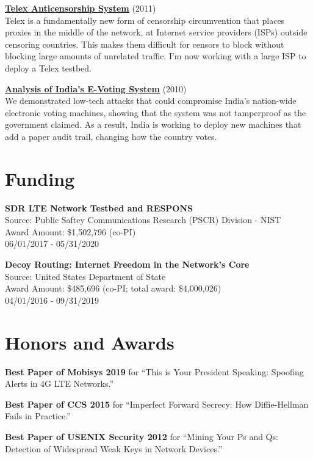 \documentclass[margin,11pt]{res} %
\begin{document}
\textbf{\href{https://telex.cc/}{Telex Anticensorship System}} (2011)\\
Telex is a fundamentally new form of censorship circumvention that places proxies in the middle of the network, at Internet service providers (ISPs) outside censoring countries.  This makes them difficult for censors to block without blocking large amounts of unrelated traffic. I'm now working with a large ISP to deploy a Telex testbed.

\textbf{\href{http://indiaevm.org/}{Analysis of India's E-Voting System}} (2010)\\
We demonstrated low-tech attacks that could compromise India's nation-wide electronic voting machines, showing that the system was not tamperproof as the government claimed.  As a result, India is working to deploy new machines that add a paper audit trail, changing how the country votes.

\section{\large Funding}

\textbf{SDR LTE Network Testbed and RESPONS} \\
Source: Public Saftey Communications Research (PSCR) Division - NIST \\
Award Amount: \$1,502,796 (co-PI) \\
06/01/2017 - 05/31/2020

\textbf{Decoy Routing: Internet Freedom in the Network's Core} \\
Source: United States Department of State \\
Award Amount: \$485,696 (co-PI; total award: \$4,000,026) \\
04/01/2016 - 09/31/2019



\vspace{6pt}
\section{\large Honors and Awards}
    \textbf{Best Paper of Mobisys 2019}
    for ``This is Your President Speaking: Spoofing Alerts in 4G LTE Networks.''

    \textbf{Best Paper of CCS 2015}
    for ``Imperfect Forward Secrecy: How Diffie-Hellman Fails in Practice.''

    \textbf{Best Paper of USENIX Security 2012}
    for ``Mining Your Ps and Qs: Detection of Widespread Weak Keys in Network Devices.''
\end{document}
